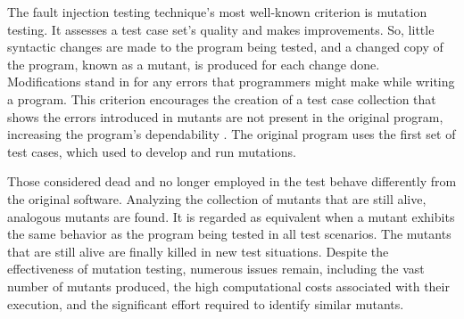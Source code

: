 The fault injection testing technique's most well-known criterion is mutation testing. It assesses a test case set's quality and makes improvements. So, little syntactic changes are made to the program being tested, and a changed copy of the program, known as a mutant, is produced for each change done. Modifications stand in for any errors that programmers might make while writing a program. This criterion encourages the creation of a test case collection that shows the errors introduced in mutants are not present in the original program, increasing the program's dependability \cite{ref33}. The original program uses the first set of test cases, which used to develop and run mutations. \par 
Those considered dead and no longer employed in the test behave differently from the original software. Analyzing the collection of mutants that are still alive, analogous mutants are found. It is regarded as equivalent when a mutant exhibits the same behavior as the program being tested in all test scenarios. The mutants that are still alive are finally killed in new test situations. Despite the effectiveness of mutation testing, numerous issues remain, including the vast number of mutants produced, the high computational costs associated with their execution, and the significant effort required to identify similar mutants. 
